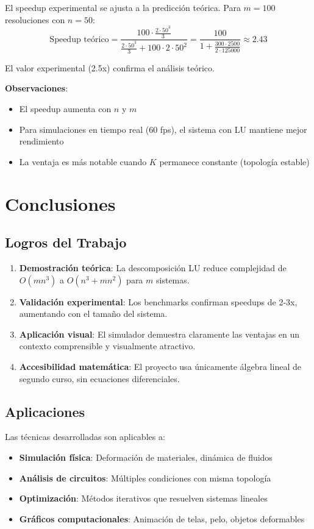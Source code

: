 \documentclass[12pt,a4paper]{article}
\begin{document}
El speedup experimental se ajusta a la predicción teórica. Para \(m=100\) resoluciones con \(n=50\):
\[
\text{Speedup teórico} = \frac{100 \cdot \frac{2 \cdot 50^3}{3}}{\frac{2 \cdot 50^3}{3} + 100 \cdot 2 \cdot 50^2} = \frac{100}{1 + \frac{300 \cdot 2500}{2 \cdot 125000}} \approx 2.43
\]

El valor experimental (2.5x) confirma el análisis teórico.

\textbf{Observaciones}:
\begin{itemize}
\item El speedup aumenta con \(n\) y \(m\)
\item Para simulaciones en tiempo real (60 fps), el sistema con LU mantiene mejor rendimiento
\item La ventaja es más notable cuando \(K\) permanece constante (topología estable)
\end{itemize}

\section{Conclusiones}

\subsection{Logros del Trabajo}

\begin{enumerate}
\item \textbf{Demostración teórica}: La descomposición LU reduce complejidad de \(O(mn^3)\) a \(O(n^3 + mn^2)\) para \(m\) sistemas.

\item \textbf{Validación experimental}: Los benchmarks confirman speedups de 2-3x, aumentando con el tamaño del sistema.

\item \textbf{Aplicación visual}: El simulador demuestra claramente las ventajas en un contexto comprensible y visualmente atractivo.

\item \textbf{Accesibilidad matemática}: El proyecto usa únicamente álgebra lineal de segundo curso, sin ecuaciones diferenciales.
\end{enumerate}

\subsection{Aplicaciones}

Las técnicas desarrolladas son aplicables a:
\begin{itemize}
\item \textbf{Simulación física}: Deformación de materiales, dinámica de fluidos
\item \textbf{Análisis de circuitos}: Múltiples condiciones con misma topología
\item \textbf{Optimización}: Métodos iterativos que resuelven sistemas lineales
\item \textbf{Gráficos computacionales}: Animación de telas, pelo, objetos deformables
\end{itemize}
\end{document}
